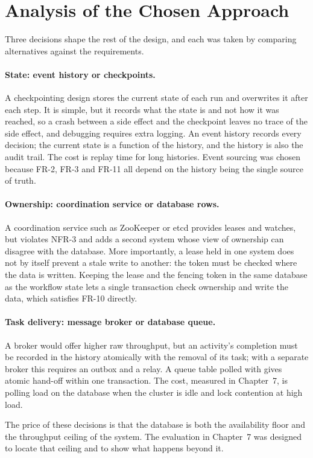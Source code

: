 \section{Analysis of the Chosen Approach}

Three decisions shape the rest of the design, and each was taken by comparing
alternatives against the requirements.

\paragraph{State: event history or checkpoints.} A checkpointing design stores
the current state of each run and overwrites it after each step. It is
simple, but it records what the state is and not how it was reached, so a
crash between a side effect and the checkpoint leaves no trace of the side
effect, and debugging requires extra logging. An event history records every
decision; the current state is a function of the history, and the history is
also the audit trail. The cost is replay time for long histories. Event
sourcing was chosen because FR-2, FR-3 and FR-11 all depend on the history
being the single source of truth.

\paragraph{Ownership: coordination service or database rows.} A
coordination service such as ZooKeeper or etcd provides leases and watches,
but violates NFR-3 and adds a second system whose view of ownership can
disagree with the database. More importantly, a lease held in one system does
not by itself prevent a stale write to another: the token must be checked
where the data is written. Keeping the lease and the fencing token in the
same database as the workflow state lets a single transaction check ownership
and write the data, which satisfies FR-10 directly.

\paragraph{Task delivery: message broker or database queue.} A broker would
offer higher raw throughput, but an activity's completion must be recorded in
the history atomically with the removal of its task; with a separate broker
this requires an outbox and a relay. A queue table polled with
 gives atomic hand-off within one
transaction. The cost, measured in Chapter~7, is polling load on the database
when the cluster is idle and lock contention at high load.

The price of these decisions is that the database is both the availability
floor and the throughput ceiling of the system. The evaluation in Chapter~7
was designed to locate that ceiling and to show what happens beyond it.

